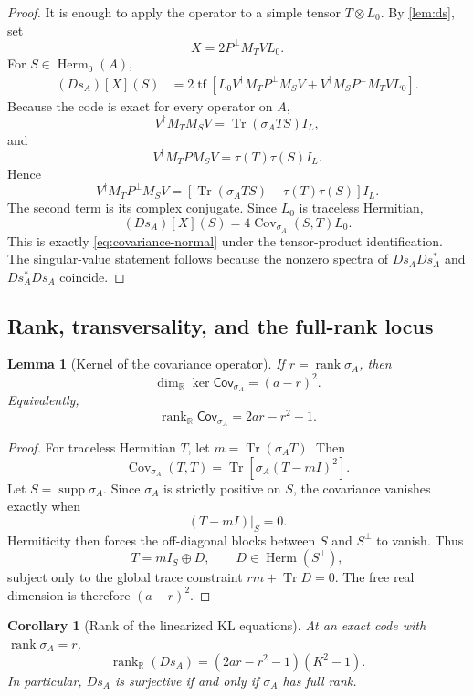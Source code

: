 \documentclass[11pt]{article}
\newtheorem{lemma}[theorem]{Lemma}
\newtheorem{corollary}[theorem]{Corollary}
\theoremstyle{definition}
\newcommand{\Herm}{\operatorname{Herm}}
\newcommand{\rank}{\operatorname{rank}}
\newcommand{\Tr}{\operatorname{Tr}}
\newcommand{\tf}{\operatorname{tf}}
\newcommand{\Cov}{\operatorname{Cov}}
\newcommand{\supp}{\operatorname{supp}}
\newcommand{\R}{\mathbb R}
\newcommand{\1}{\mathbf 1}
\begin{document}
\begin{proof}
It is enough to apply the operator to a simple tensor $T\otimes L_0$.  By \cref{lem:ds}, set
\[
X=2P^\perp M_TVL_0.
\]
For $S\in\Herm_0(A)$,
\begin{align*}
(Ds_A)[X](S)
&=2\tf\!\left[
L_0 V^\dagger M_TP^\perp M_SV
+V^\dagger M_SP^\perp M_TV L_0
\right].
\end{align*}
Because the code is exact for every operator on $A$,
\[
V^\dagger M_TM_SV=\Tr(\sigma_A TS)I_L,
\]
and
\[
V^\dagger M_TPM_SV=\tau(T)\tau(S)I_L.
\]
Hence
\[
V^\dagger M_TP^\perp M_SV
=
\left[\Tr(\sigma_A TS)-\tau(T)\tau(S)\right]I_L.
\]
The second term is its complex conjugate.  Since $L_0$ is traceless Hermitian,
\[
(Ds_A)[X](S)
=4\Cov_{\sigma_A}(S,T)L_0.
\]
This is exactly \eqref{eq:covariance-normal} under the tensor-product identification.  The singular-value statement follows because the nonzero spectra of $Ds_A Ds_A^*$ and $Ds_A^*Ds_A$ coincide.
\end{proof}


\subsection{Rank, transversality, and the full-rank locus}

\begin{lemma}[Kernel of the covariance operator]
\label{lem:cov-kernel}
If $r=\rank\sigma_A$, then
\begin{equation}
\dim_{\R}\ker\mathsf{Cov}_{\sigma_A}=(a-r)^2.
\label{eq:cov-kernel-dim}
\end{equation}
Equivalently,
\begin{equation}
\rank_{\R}\mathsf{Cov}_{\sigma_A}=2ar-r^2-1.
\label{eq:cov-rank}
\end{equation}
\end{lemma}

\begin{proof}
For traceless Hermitian $T$, let $m=\Tr(\sigma_AT)$.  Then
\[
\Cov_{\sigma_A}(T,T)=\Tr\left[\sigma_A(T-mI)^2\right].
\]
Let $S=\supp\sigma_A$.  Since $\sigma_A$ is strictly positive on $S$, the covariance vanishes exactly when
\[
(T-mI)|_S=0.
\]
Hermiticity then forces the off-diagonal blocks between $S$ and $S^\perp$ to vanish.  Thus
\[
T=mI_S\oplus D,
\qquad D\in\Herm(S^\perp),
\]
subject only to the global trace constraint $rm+\Tr D=0$.  The free real dimension is therefore $(a-r)^2$.
\end{proof}

\begin{corollary}[Rank of the linearized KL equations]
\label{cor:ds-rank}
At an exact code with $\rank\sigma_A=r$,
\begin{equation}
\boxed{
\rank_{\R}(Ds_A)
=(2ar-r^2-1)(K^2-1).
}
\label{eq:ds-rank}
\end{equation}
In particular, $Ds_A$ is surjective if and only if $\sigma_A$ has full rank.
\end{corollary}
\end{document}
